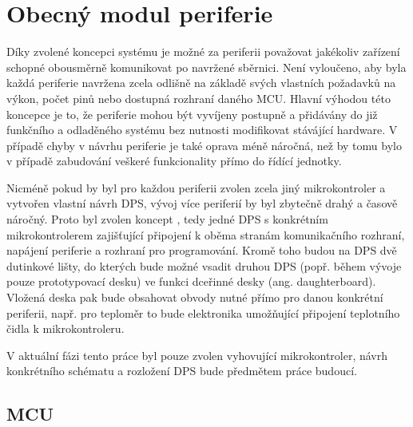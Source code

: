 \section{Obecný modul periferie}


    Díky zvolené koncepci systému je možné za periferii považovat jakékoliv zařízení schopné obousměrně komunikovat po navržené sběrnici. Není vyloučeno, aby byla každá periferie navržena zcela odlišně na základě svých vlastních požadavků na výkon, počet pinů nebo dostupná rozhraní daného MCU. Hlavní výhodou této koncepce je to, že periferie mohou být vyvíjeny postupně a přidávány do již funkčního a odladěného systému bez nutnosti modifikovat stávájící hardware. V případě chyby v návrhu periferie je také oprava méně náročná, než by tomu bylo v případě zabudování veškeré funkcionality přímo do řídící jednotky. 

    Nicméně pokud by byl pro každou periferii zvolen zcela jiný mikrokontroler a vytvořen vlastní návrh DPS, vývoj více periferií by byl zbytečně drahý a časově náročný. Proto byl zvolen koncept , tedy jedné DPS s konkrétním mikrokontrolerem zajišťující připojení k oběma stranám komunikačního rozhraní, napájení periferie a rozhraní pro programování. Kromě toho budou na DPS dvě dutinkové lišty, do kterých bude možné vsadit druhou DPS (popř. během vývoje pouze prototypovací desku) ve funkci dceřinné desky (ang. daughterboard). Vložená deska pak bude obsahovat obvody nutné přímo pro danou konkrétní periferii, např. pro teploměr to bude elektronika umožňující připojení teplotního čidla k mikrokontroleru. 

    V aktuální fázi tento práce byl pouze zvolen vyhovující mikrokontroler, návrh konkrétního schématu a rozložení DPS bude předmětem práce budoucí. 
    
    \subsection{MCU}

